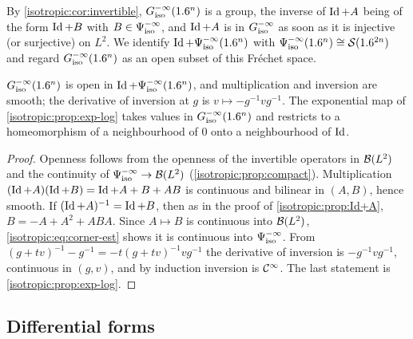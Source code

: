 By \cref{isotropic:cor:invertible}, $G^{-\infty}_{\mathrm{iso}}(1.6^n)$ is a group, the inverse of
$\operatorname{Id}+A$ being of the form $\operatorname{Id}+B$ with $B\in\Psi^{-\infty}_{\mathrm{iso}}$, and $\operatorname{Id}+A$ is in
$G^{-\infty}_{\mathrm{iso}}$ as soon as it is injective (or surjective) on $L^2$. We identify
$\operatorname{Id}+\Psi^{-\infty}_{\mathrm{iso}}(1.6^n)$ with $\Psi^{-\infty}_{\mathrm{iso}}(1.6^n)\cong\mathcal{S}(1.6^{2n})$ and
regard $G^{-\infty}_{\mathrm{iso}}(1.6^n)$ as an open subset of this Fréchet space.

\begin{proposition}\label{isotropic:prop:group}
$G^{-\infty}_{\mathrm{iso}}(1.6^n)$ is open in $\operatorname{Id}+\Psi^{-\infty}_{\mathrm{iso}}(1.6^n)$, and multiplication and
inversion are smooth; the derivative of inversion at $g$ is
$v\mapsto-g^{-1}vg^{-1}$. The exponential map of
\cref{isotropic:prop:exp-log} takes values in $G^{-\infty}_{\mathrm{iso}}(1.6^n)$ and restricts to a
homeomorphism of a neighbourhood of $0$ onto a neighbourhood of $\operatorname{Id}$.
\end{proposition}
\begin{proof}
Openness follows from the openness of the invertible operators in $\mathcal{B}(L^2)$
and the continuity of $\Psi^{-\infty}_{\mathrm{iso}}\to\mathcal{B}(L^2)$
(\cref{isotropic:prop:compact}). Multiplication
$(\operatorname{Id}+A)(\operatorname{Id}+B)=\operatorname{Id}+A+B+AB$ is continuous and bilinear in $(A,B)$, hence
smooth. If $(\operatorname{Id}+A)^{-1}=\operatorname{Id}+B$, then as in the proof of
\cref{isotropic:prop:Id+A}, $B=-A+A^2+ABA$. Since $A\mapsto B$ is continuous
into $\mathcal{B}(L^2)$, \eqref{isotropic:eq:corner-est} shows it is continuous into
$\Psi^{-\infty}_{\mathrm{iso}}$. From $(g+tv)^{-1}-g^{-1}=-t(g+tv)^{-1}vg^{-1}$ the
derivative of inversion is $-g^{-1}vg^{-1}$, continuous in $(g,v)$, and by
induction inversion is $\mathcal{C}^\infty$. The last statement is
\cref{isotropic:prop:exp-log}.
\end{proof}

\subsection{Differential forms}

